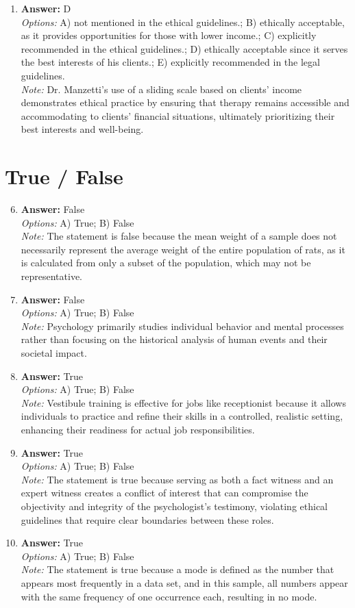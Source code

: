 \documentclass[12pt]{article}
\begin{document}
\begin{enumerate}[label=\arabic*.]
\item \textbf{Answer:} D
\\ \textit{Options:} A) not mentioned in the ethical guidelines.; B) ethically acceptable, as it provides opportunities for those with lower income.; C) explicitly recommended in the ethical guidelines.; D) ethically acceptable since it serves the best interests of his clients.; E) explicitly recommended in the legal guidelines.
\\ \textit{Note:} Dr. Manzetti's use of a sliding scale based on clients' income demonstrates ethical practice by ensuring that therapy remains accessible and accommodating to clients' financial situations, ultimately prioritizing their best interests and well-being.
\end{enumerate}

\section*{True / False}
\begin{enumerate}[label=\arabic*.]
\setcounter{enumi}{5}
\item \textbf{Answer:} False
\\ \textit{Options:} A) True; B) False
\\ \textit{Note:} The statement is false because the mean weight of a sample does not necessarily represent the average weight of the entire population of rats, as it is calculated from only a subset of the population, which may not be representative.
\item \textbf{Answer:} False
\\ \textit{Options:} A) True; B) False
\\ \textit{Note:} Psychology primarily studies individual behavior and mental processes rather than focusing on the historical analysis of human events and their societal impact.
\item \textbf{Answer:} True
\\ \textit{Options:} A) True; B) False
\\ \textit{Note:} Vestibule training is effective for jobs like receptionist because it allows individuals to practice and refine their skills in a controlled, realistic setting, enhancing their readiness for actual job responsibilities.
\item \textbf{Answer:} True
\\ \textit{Options:} A) True; B) False
\\ \textit{Note:} The statement is true because serving as both a fact witness and an expert witness creates a conflict of interest that can compromise the objectivity and integrity of the psychologist's testimony, violating ethical guidelines that require clear boundaries between these roles.
\item \textbf{Answer:} True
\\ \textit{Options:} A) True; B) False
\\ \textit{Note:} The statement is true because a mode is defined as the number that appears most frequently in a data set, and in this sample, all numbers appear with the same frequency of one occurrence each, resulting in no mode.
\end{enumerate}
\end{document}
